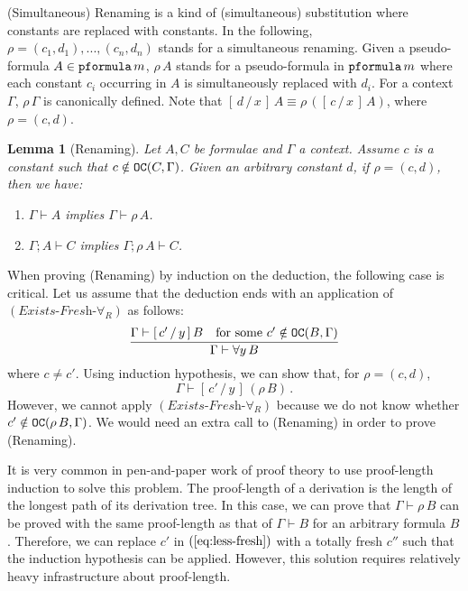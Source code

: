 \documentclass{svjour3}                     %
\newtheorem{lem}[thm]{Lemma}
\newcommand{\seq}[2]{\infer{#2}{#1}}
\newcommand{\Ga}{\Gamma}
\newcommand{\vd}{\vdash}
\newcommand{\substs}[3]{[\, #3\, \slash\, #2\,]\, #1}
\newcommand{\scol}{\mathop{;}}
\newcommand{\tpfml}{\textup{\tt pformula}}
\newcommand{\tOC}{\textup{\tt OC}}
\begin{document}
(Simultaneous) Renaming is a kind of (simultaneous) substitution where constants are replaced with constants. In the following, $\rho = (c_1,d_1),...,(c_n, d_n)$ stands for a simultaneous renaming.
Given a pseudo-formula $A \in \tpfml \, m$, $\rho \, A$ stands for a
pseudo-formula in $\tpfml \, m$ where each constant $c_i$ occurring in
$A$ is simultaneously replaced with $d_i$. For a context $\Ga$, $\rho\,
\Ga$ is canonically defined. Note that $\substs{A}{x}{d} \equiv \rho\,(\substs{A}{x}{c})$, where $\rho = (c,d)$.

\begin{lem}[Renaming]\label{renaming}
  Let $A, C$ be formulae and $\Ga$ a context. Assume $c$ is a constant such that $c \notin \tOC(C, \Ga)$. Given an arbitrary constant $d$, if $\rho = (c,d)$, then we have:
  \begin{enumerate}
  \item $\Ga \vd A$ implies $\Ga \vd \rho\, A$.
  \item $\Ga \scol A \vd C$ implies $\Ga \scol \rho\, A \vd C$.
  \end{enumerate}
\end{lem}

When proving (Renaming) by induction on the deduction, the following case is critical. Let us assume that the deduction ends with an application of $(\textit{Exists-Fresh-}\forall_R)$ as follows:
\[
\seq{\Ga \vd \substs{B}{y}{c'}{} & \text{for some } c' \notin \tOC(B, \Ga)}{\Ga\vd  \forall y\, B}
\]
where $c \neq c'$. 
Using induction hypothesis, we can show that, for $\rho = (c,d)$,
\begin{equation}
  \label{eq:less-fresh}
  \Ga \vd \substs{(\rho \, B)}{y}{c'}\,.  
\end{equation}
However, we cannot apply $(\textit{Exists-Fresh-}\forall_R)$ because we do not know whether $c' \notin \tOC(\rho \, B, \Ga)$.
We would need an extra call to (Renaming) in order to prove (Renaming).

It is very common in pen-and-paper work of proof theory to use proof-length induction to solve this problem. The proof-length of a derivation is the length of the longest path of its derivation tree. In this case, we can prove that $\Ga \vd \rho\, B$ can be proved with the same proof-length as that of $\Ga \vd B$ for an arbitrary formula $B$. Therefore, we can replace $c'$ in $(\ref{eq:less-fresh})$ with a totally fresh $c''$ such that the induction hypothesis can be applied. However, this solution requires relatively heavy infrastructure about proof-length.
\end{document}
